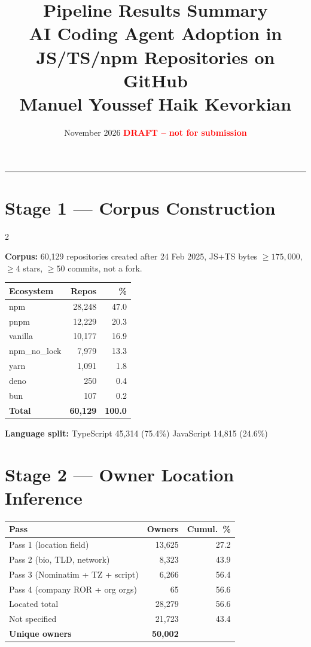 \documentclass[10pt,a4paper]{article}
\title{\textbf{Pipeline Results Summary}\\
\large AI Coding Agent Adoption in JS/TS/npm Repositories on GitHub\\[2pt]
\normalsize Manuel Youssef Haik Kevorkian}
\date{November 2026 \quad \textcolor{red}{\textbf{DRAFT -- not for submission}}}
\begin{document}
\maketitle
\vspace{-4pt}
\hrule
\vspace{8pt}

\section*{Stage 1 --- Corpus Construction}

\begin{multicols}{2}

\textbf{Corpus:} 60,129 repositories created after 24 Feb 2025, JS+TS bytes
$\geq 175{,}000$, $\geq 4$ stars, $\geq 50$ commits, not a fork.

\begin{tabular}{@{}lrr@{}}
\toprule
Ecosystem & Repos & \% \\
\midrule
npm           & 28,248 & 47.0 \\
pnpm          & 12,229 & 20.3 \\
vanilla       & 10,177 & 16.9 \\
npm\_no\_lock &  7,979 & 13.3 \\
yarn          &  1,091 &  1.8 \\
deno          &    250 &  0.4 \\
bun           &    107 &  0.2 \\
\midrule
\textbf{Total} & \textbf{60,129} & \textbf{100.0} \\
\bottomrule
\end{tabular}

\columnbreak

\textbf{Language split:} TypeScript 45,314 (75.4\%) \quad JavaScript 14,815 (24.6\%)

\vspace{6pt}
\section*{Stage 2 --- Owner Location Inference}

\begin{tabular}{@{}lrr@{}}
\toprule
Pass & Owners & Cumul.\ \% \\
\midrule
Pass 1 (location field)            & 13,625 & 27.2 \\
Pass 2 (bio, TLD, network)         &  8,323 & 43.9 \\
Pass 3 (Nominatim + TZ + script)   &  6,266 & 56.4 \\
Pass 4 (company ROR + org orgs)    &     65 & 56.6 \\
\midrule
Located total              & 28,279 & 56.6 \\
Not specified              & 21,723 & 43.4 \\
\textbf{Unique owners}     & \textbf{50,002} & \\
\bottomrule
\end{tabular}


\end{multicols}
\end{document}
